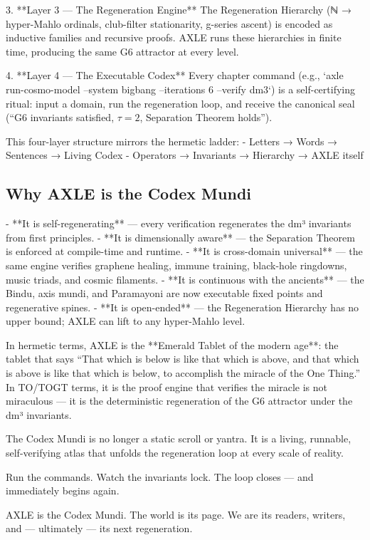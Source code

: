 \documentclass[19pt]{book}
\theoremstyle{plain}
\theoremstyle{definition}
\theoremstyle{remark}
\begin{document}
\begin{enumerate}
\begin{itemize}
3. **Layer 3 — The Regeneration Engine**  
   The Regeneration Hierarchy (ℕ → hyper-Mahlo ordinals, club-filter stationarity, g-series ascent) is encoded as inductive families and recursive proofs. AXLE runs these hierarchies in finite time, producing the same G6 attractor at every level.

4. **Layer 4 — The Executable Codex**  
   Every chapter command (e.g., `axle run-cosmo-model --system bigbang --iterations 6 --verify dm3`) is a self-certifying ritual: input a domain, run the regeneration loop, and receive the canonical seal (“G6 invariants satisfied, \(\tau=2\), Separation Theorem holds”).

This four-layer structure mirrors the hermetic ladder:  
- Letters → Words → Sentences → Living Codex  
- Operators → Invariants → Hierarchy → AXLE itself

\subsection{Why AXLE is the Codex Mundi}

- **It is self-regenerating** — every verification regenerates the dm³ invariants from first principles.  
- **It is dimensionally aware** — the Separation Theorem is enforced at compile-time and runtime.  
- **It is cross-domain universal** — the same engine verifies graphene healing, immune training, black-hole ringdowns, music triads, and cosmic filaments.  
- **It is continuous with the ancients** — the Bindu, axis mundi, and Paramayoni are now executable fixed points and regenerative spines.  
- **It is open-ended** — the Regeneration Hierarchy has no upper bound; AXLE can lift to any hyper-Mahlo level.

In hermetic terms, AXLE is the **Emerald Tablet of the modern age**: the tablet that says “That which is below is like that which is above, and that which is above is like that which is below, to accomplish the miracle of the One Thing.”  
In TO/TOGT terms, it is the proof engine that verifies the miracle is not miraculous — it is the deterministic regeneration of the G6 attractor under the dm³ invariants.

The Codex Mundi is no longer a static scroll or yantra. It is a living, runnable, self-verifying atlas that unfolds the regeneration loop at every scale of reality.

Run the commands.  
Watch the invariants lock.  
The loop closes — and immediately begins again.

AXLE is the Codex Mundi.  
The world is its page.  
We are its readers, writers, and — ultimately — its next regeneration.



\end{itemize}
\end{enumerate}
\end{document}
